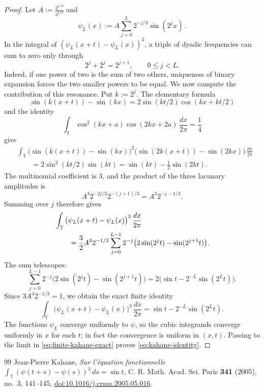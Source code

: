 \documentclass[10pt,a4paper]{amsart}
\newcommand{\T}{\mathbb T}
\begin{document}
\begin{proof}
Let $A:= \frac{2^{1/9}}{3^{1/3}}$ and
\[
 \psi_L(x):=A\sum_{j=0}^L2^{-j/3}\sin(2^j x) \,.
\]
In the integral of $(\psi_L(x+t)-\psi_L(x))^3$, a triple of dyadic frequencies can sum to zero only through
\[
 2^j+2^j=2^{j+1},
 \qquad 0\leq j<L.
\]
Indeed, if one power of two is the sum of two others, uniqueness of binary expansion forces the two smaller powers to be equal.  We now compute the contribution of this resonance.  Put $k:=2^j$.  The elementary formula
\[
 \sin(k(x+t))-\sin(kx)
 =2\sin(kt/2)\cos(kx+kt/2)
\]
and the identity
\[
 \int_\T\cos^2(kx+a)\cos(2kx+2a)\,\frac{dx}{2\pi}=\frac14
\]
give
\begin{align*}
 &\int_\T
 \big(\sin(k(x+t))-\sin(kx)\big)^2
 \big(\sin(2k(x+t))-\sin(2kx)\big)\,\frac{dx}{2\pi}\\
 &\qquad=2\sin^2(kt/2)\sin(kt)
 =\sin(kt)-\frac12\sin(2kt).
\end{align*}
The multinomial coefficient is $3$, and the product of the three lacunary amplitudes is
\[
 A^3 2^{-2j/3}2^{-(j+1)/3}=A^3 2^{-j-1/3}.
\]
Summing over $j$ therefore gives
\begin{align}
 &\int_\T
 \big(\psi_L(x+t)-\psi_L(x)\big)^3\,\frac{dx}{2\pi}\notag\\
 &\qquad=\frac32A^3 2^{-1/3}
 \sum_{j=0}^{L-1}2^{-j}
 \big(2\sin(2^j t)-\sin(2^{j+1}t)\big).\label{eq:finite-kahane}
\end{align}
The sum telescopes:
\[
 \sum_{j=0}^{L-1}2^{-j}
 \big(2\sin(2^j t)-\sin(2^{j+1}t)\big)
 =2\big(\sin t-2^{-L}\sin(2^L t)\big).
\]
Since $3A^3 2^{-1/3}=1$, we obtain the exact finite identity
\begin{equation}\label{eq:finite-kahane-exact}
 \int_\T
 \big(\psi_L(x+t)-\psi_L(x)\big)^3\,\frac{dx}{2\pi}
 =\sin t-2^{-L}\sin(2^L t).
\end{equation}
The functions $\psi_L$ converge uniformly to $\psi$, so the cubic integrands converge uniformly in $x$ for each $t$; in fact the convergence is uniform in $(x,t)$.  Passing to the limit in \eqref{eq:finite-kahane-exact} proves \eqref{eq:kahane-identity}.
\end{proof}

\begin{thebibliography}{99}
 Jean-Pierre Kahane, \emph{Sur l'\'{e}quation fonctionnelle $\int_{\mathbb T}(\psi(t+s)-\psi(s))^3\,ds=\sin t$}, C. R. Math. Acad. Sci. Paris \textbf{341} (2005), no.~3, 141--145, \href{https://doi.org/10.1016/j.crma.2005.05.016}{doi:10.1016/j.crma.2005.05.016}.
\end{thebibliography}
\end{document}
